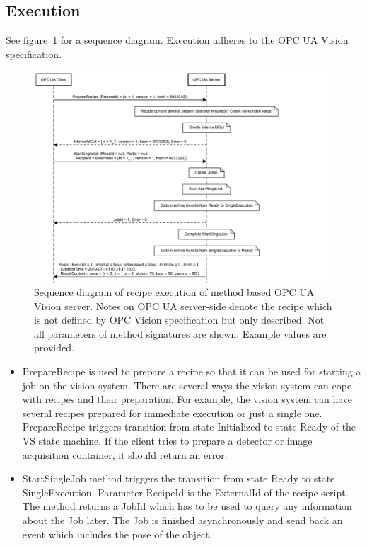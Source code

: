 \subsection{Execution}
See figure~\ref{fig:runtimeviewexec} for a sequence diagram. Execution adheres to the OPC UA Vision specification.
    
\begin{figure}
    \centering
    \includegraphics[width=1.2\textwidth]{img/OPCUAVisionPrepareRecipe.pdf}
    \caption[Sequence diagram of recipe execution]{Sequence diagram of recipe execution of method based OPC UA Vision server. Notes on OPC UA server-side denote the recipe which is not defined by OPC Vision specification but only described. Not all parameters of method signatures are shown. Example values are provided.}
    \label{fig:runtimeviewexec}
\end{figure}
    \begin{itemize}
    	\item PrepareRecipe is used to prepare a recipe so that it can be used for starting a job on the vision system. There are several ways the vision system can cope with recipes and their preparation. For example, the vision system can have several recipes prepared for immediate execution or just a single one. PrepareRecipe triggers transition from state Initialized to state Ready of the VS state machine. If the client tries to prepare a detector or image acquisition container, it should return an error.
    	\item StartSingleJob method triggers the transition from state Ready to state SingleExecution. Parameter RecipeId is the ExternalId of the recipe script. The method returns a JobId which has to be used to query any information about the Job later. The Job is finished asynchronously and send back an event which includes the pose of the object.
    \end{itemize}

